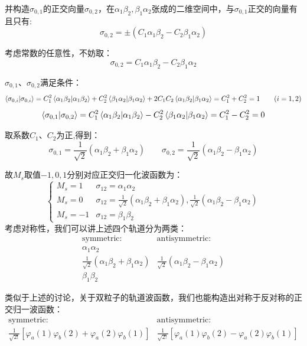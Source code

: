 并构造$\sigma_{0,1}$的正交向量$\sigma_{0,2}$，在$\alpha_1\beta_2,\beta_1\alpha_2$张成的二维空间中，与$\sigma_{0,1}$正交的向量有且只有:
\[\sigma_{0,2}= \pm (C_1\alpha_1\beta_2-C_2\beta_1\alpha_2)\]

考虑常数的任意性，不妨取：
\[\sigma_{0,2}= C_1\alpha_1\beta_2-C_2\beta_1\alpha_2\]

$\sigma_{0,1}$、$\sigma_{0,2}$满足条件：
\[\bra{\sigma_{0,i}}\ket{\sigma_{0,i}}=C_1^2\bra{\alpha_1\beta_2}\ket{\alpha_1\beta_2}+C_2^2\bra{\beta_1\alpha_2}\ket{\beta_1\alpha_2}+2C_1C_2\bra{\alpha_1\beta_2}\ket{\beta_1\alpha_2}=C_1^2+C_2^2=1 \qquad (i=1,2)\]
\[\bra{\sigma_{0,1}}\ket{\sigma_{0,2}}=C_1^2\bra{\alpha_1\beta_2}\ket{\alpha_1\beta_2}-C_2^2\bra{\beta_1\alpha_2}\ket{\beta_1\alpha_2}=C_1^2-C_2^2=0\]

取系数$C_1$、$C_2$为正,得到：
\[\sigma_{0,1}=\frac{1}{\sqrt{2}}(\alpha_1\beta_2+\beta_1\alpha_2) \qquad \sigma_{0,2}= \frac{1}{\sqrt{2}}(\alpha_1\beta_2-\beta_1\alpha_2)\]

故$M_s$取值$-1,0,1$分别对应正交归一化波函数为：
\[ 
    \left \{
    \begin{array}{ll}
        M_s=1  & \sigma_{12}=\alpha_1\alpha_2\\
        M_s=0  & \sigma_{12}=\frac{1}{\sqrt{2}}(\alpha_1\beta_2+\beta_1\alpha_2),\frac{1}{\sqrt{2}}(\alpha_1\beta_2-\beta_1\alpha_2)\\
        M_s=-1 & \sigma_{12}=\beta_1\beta_2
    \end{array}
    \right .
\]
考虑对称性，我们可以讲上述四个轨道分为两类：
\[ 
    \begin{array}{ll}
        \text{symmetric}: & \text{antisymmetric}: \\
         \alpha_1\alpha_2\\
         \frac{1}{\sqrt{2}}(\alpha_1\beta_2+\beta_1\alpha_2) & \frac{1}{\sqrt{2}}(\alpha_1\beta_2-\beta_1\alpha_2)\\
         \beta_1\beta_2
    \end{array}
\]

类似于上述的讨论，关于双粒子的轨道波函数，我们也能构造出对称于反对称的正交归一波函数：
\[
    \begin{array}{ll}
        \text{symmetric}: & \text{antisymmetric}: \\
        \frac{1}{\sqrt{2!}}[\varphi_a(1)\varphi_b(2)+\varphi_a(2)\varphi_b(1)] & \frac{1}{\sqrt{2!}}[\varphi_a(1)\varphi_b(2)-\varphi_a(2)\varphi_b(1)] 
    \end{array}
\]

